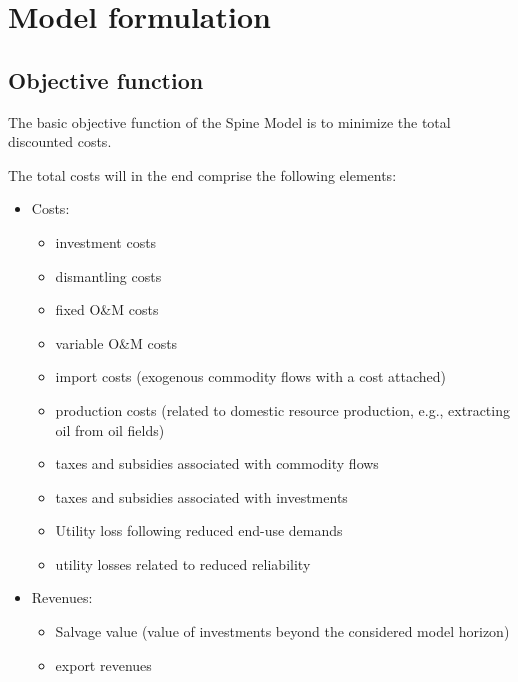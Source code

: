 

\section{Model formulation}

\subsection{Objective function}

The basic objective function of the Spine Model is to minimize the total discounted costs. 


The total costs will in the end comprise the following elements:
\begin{itemize}
	\item Costs:
	\begin{itemize}
		\item investment costs
		\item dismantling costs
		\item fixed O\&M costs
		\item variable O\&M costs
		\item import costs (exogenous commodity flows with a cost attached)
		\item production costs (related to domestic resource production, e.g., extracting oil from oil fields)
		\item taxes and subsidies associated with commodity flows
		\item taxes and subsidies associated with investments
		\item Utility loss following reduced end-use demands
		\item utility losses related to reduced reliability
	\end{itemize}
	\item Revenues:
	\begin{itemize}
		\item Salvage value (value of investments beyond the considered model horizon)
		\item export revenues
	\end{itemize}
\end{itemize}





